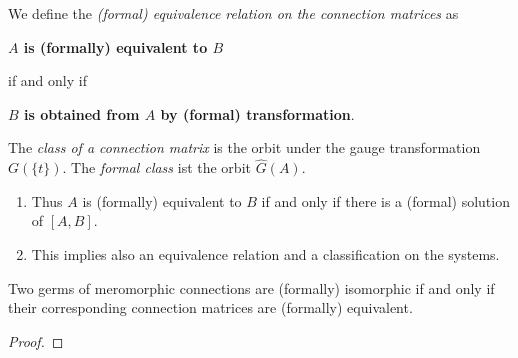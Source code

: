 \begin{comment}
  \begin{rem}
    \[
      {}^{(F_2F_1)}\!A =
      {}^{F_2}\!\left({}^{F_1}\!A\right)
    \]
    \rewrite{since}
    \begin{align*}
      {}^{F_2F_1}\!A^0
      &= d(F_2F_1)(F_2F_1)^{-1}+F_2F_1 A(F_2F_1)^{-1}
    \\&=\left(
        \left(dF_2\right)̂F_1
        +F_2\left(dF_1\right)̂
      \right) F_1^{̀-1} F_2^{̀-1}
      +F_2F_1 A F_1^{̀-1}F_2^{̀-1}
    \\&= \left(dF_2\right)̂F_2^{-1}
       +F_2\left(dF_1\right)̂ F_1^{̀-1} F_2^{̀-1}
       +F_2
       \left(
         {}^{F_1}\!A-\left(dF_1\right)F^{-1}
       \right)
       F_2^{̀-1}
    \\&= \left(dF_2\right)̂F_2^{-1} +F_2 {}^{F_1}\!A F_2^{̀-1}
    \\&= {}^{F_2}\!\left({}^{F_1}\!A\right)
    \end{align*}
  \end{rem}
\end{comment}
\begin{defn}
  We define the \emph{(formal) equivalence relation on the connection matrices}
  as
  \begin{einr}
    \textbf{\boldmath$A$ is (formally) equivalent to $B$}
  \end{einr}
  if and only if
  \begin{einr}
    \textbf{\boldmath$B$ is obtained from $A$ by (formal) transformation}.
  \end{einr}
  The \emph{class of a connection matrix} is the orbit under the gauge
  transformation  $G(\!\{t\}\!)$. The \emph{formal class} ist the
  orbit  $\hat G(A)$.
  \begin{s-rem}
    \begin{enumerate}
      \item Thus $A$ is (formally) equivalent to $B$ if and only if there is a
        (formal) solution of $[A,B]$.
      \item This implies also an equivalence relation and a classification on
        the systems.
    \end{enumerate}
  \end{s-rem}
\end{defn}

\begin{prop}
  Two germs of meromorphic connections are (formally) isomorphic if and only if
  their corresponding connection matrices are (formally) equivalent.
\end{prop}
\begin{proof}
  \TODO{}
\end{proof}

